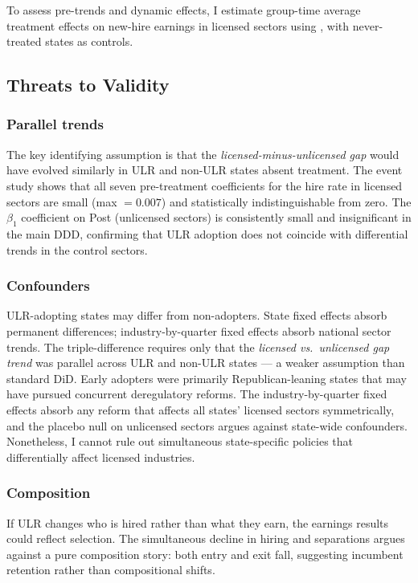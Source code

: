 \documentclass[12pt]{article}
\begin{document}
To assess pre-trends and dynamic effects, I estimate group-time average treatment effects on new-hire earnings in licensed sectors using \citet{CallawayS2021}, with never-treated states as controls.

\subsection{Threats to Validity}

\subsubsection*{Parallel trends} The key identifying assumption is that the \emph{licensed-minus-unlicensed gap} would have evolved similarly in ULR and non-ULR states absent treatment. The event study shows that all seven pre-treatment coefficients for the hire rate in licensed sectors are small (max $= 0.007$) and statistically indistinguishable from zero. The $\beta_1$ coefficient on Post (unlicensed sectors) is consistently small and insignificant in the main DDD, confirming that ULR adoption does not coincide with differential trends in the control sectors.

\subsubsection*{Confounders} ULR-adopting states may differ from non-adopters. State fixed effects absorb permanent differences; industry-by-quarter fixed effects absorb national sector trends. The triple-difference requires only that the \emph{licensed vs.\ unlicensed gap trend} was parallel across ULR and non-ULR states --- a weaker assumption than standard DiD. Early adopters were primarily Republican-leaning states that may have pursued concurrent deregulatory reforms. The industry-by-quarter fixed effects absorb any reform that affects all states' licensed sectors symmetrically, and the placebo null on unlicensed sectors argues against state-wide confounders. Nonetheless, I cannot rule out simultaneous state-specific policies that differentially affect licensed industries.

\subsubsection*{Composition} If ULR changes who is hired rather than what they earn, the earnings results could reflect selection. The simultaneous decline in hiring and separations argues against a pure composition story: both entry and exit fall, suggesting incumbent retention rather than compositional shifts.
\end{document}
